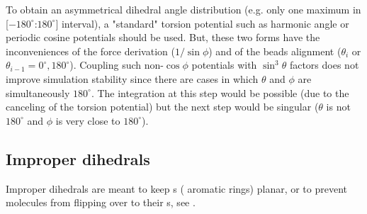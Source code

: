 To obtain an asymmetrical dihedral angle distribution (e.g. only one maximum in [$-180^{\circ}$:$180^{\circ}$] interval),
a "standard" torsion potential such as harmonic angle  or  periodic cosine potentials should be used.
But, these two forms have the inconveniences of the force derivation ($1/\sin\phi$) and of the beads alignment
($\theta_i$ or $\theta_{i-1} = 0^{\circ}, 180^{\circ}$).
Coupling such non-$\cos\phi$ potentials with $\sin^3\theta$ factors does not improve simulation stability since there are
cases in which $\theta$ and $\phi$ are simultaneously $180^{\circ}$. The integration at this step would be possible
(due to the canceling of the torsion potential) but the next step would be singular
($\theta$ is not $180^{\circ}$ and $\phi$ is very close to $180^{\circ}$).


\subsection{Improper dihedrals}
\label{sec:imp}
Improper dihedrals are meant to keep s ({\eg} 
aromatic rings) planar, or to prevent molecules from flipping over to their
s, see .

